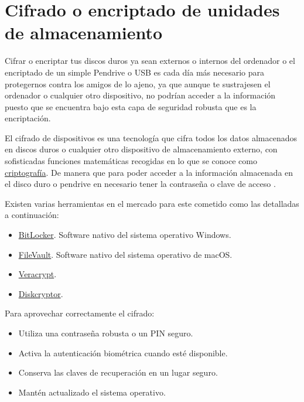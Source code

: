 \documentclass[
  spanish,
  a4paper,
  openany]{book}
\begin{document}
\section{Cifrado o encriptado de unidades de almacenamiento}\label{cifrado-o-encriptado-de-unidades-de-almacenamiento}

Cifrar o encriptar tus discos duros ya sean externos o internos del ordenador o el encriptado de un simple Pendrive o USB es cada día más necesario para protegernos contra los amigos de lo ajeno, ya que aunque te sustrajesen el ordenador o cualquier otro dispositivo, no podrían acceder a la información puesto que se encuentra bajo esta capa de seguridad robusta que es la encriptación.

El cifrado de dispositivos es una tecnología que cifra todos los datos almacenados en discos duros o cualquier otro dispositivo de almacenamiento externo, con sofisticadas funciones matemáticas recogidas en lo que se conoce como \href{https://es.wikipedia.org/wiki/Criptografía}{criptografía}. De manera que para poder acceder a la información almacenada en el disco duro o pendrive en necesario tener la contraseña o clave de acceso \citep{cifrado}.

Existen varias herramientas en el mercado para este cometido como las detalladas a continuación:

\begin{itemize}
\item
  \href{https://docs.microsoft.com/es-es/windows/security/information-protection/bitlocker/bitlocker-overview}{BitLocker}. Software nativo del sistema operativo Windows.
\item
  \href{https://support.apple.com/es-es/HT204837}{FileVault}. Software nativo del sistema operativo de macOS.
\item
  \href{https://www.veracrypt.fr}{Veracrypt}.
\item
  \href{https://diskcryptor.org/}{Diskcryptor}.
\end{itemize}

Para aprovechar correctamente el cifrado:

\begin{itemize}
\item
  Utiliza una contraseña robusta o un PIN seguro.
\item
  Activa la autenticación biométrica cuando esté disponible.
\item
  Conserva las claves de recuperación en un lugar seguro.
\item
  Mantén actualizado el sistema operativo.
\end{itemize}
\end{document}
